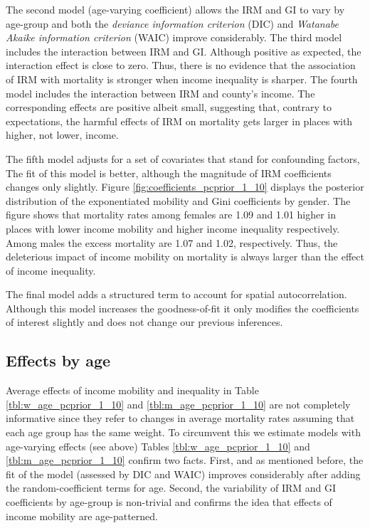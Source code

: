 \documentclass[11pt]{article}
\begin{document}
The second model (age-varying coefficient) allows the IRM and GI to vary by age-group and both the \textit{deviance information criterion} (DIC) and \textit{Watanabe Akaike information criterion} (WAIC) improve considerably. The third model includes the interaction between IRM and GI. Although positive as expected, the interaction effect is close to zero. Thus, there is no evidence that the association of IRM with mortality is stronger when income inequality is sharper. The fourth model includes the interaction between IRM and county's income. The corresponding effects are positive albeit small, suggesting that, contrary to expectations, the harmful effects of IRM on mortality gets larger in places with higher, not lower, income.  

The fifth model adjusts for a set of covariates that stand for confounding factors, The fit of this model is better, although the magnitude of IRM coefficients changes only slightly. Figure \ref{fig:coefficients_pcprior_1_10} displays the posterior distribution of the exponentiated mobility and Gini coefficients by gender. The figure shows that mortality rates among females are 1.09 and 1.01 higher in places with lower income mobility and higher income inequality respectively. Among males the excess mortality are 1.07 and 1.02, respectively. Thus, the deleterious impact of income mobility on mortality is always larger than the effect of income inequality. 

The final model adds a structured term to account for spatial autocorrelation. Although this model increases the goodness-of-fit it only modifies the coefficients of interest slightly and does not change our previous inferences.  

\subsection{Effects by age}

Average effects of income mobility and inequality in Table \ref{tbl:w_age_pcprior_1_10} and \ref{tbl:m_age_pcprior_1_10} are not completely informative since they refer to changes in average mortality rates assuming that each age group has the same weight. To circumvent this we estimate models with age-varying effects (see above) Tables \ref{tbl:w_age_pcprior_1_10} and \ref{tbl:m_age_pcprior_1_10} confirm two facts. First, and as mentioned before, the fit of the model (assessed by DIC and WAIC) improves considerably after adding the random-coefficient terms for age. Second, the variability of IRM and GI coefficients by age-group is non-trivial and confirms the idea that effects of income mobility are age-patterned. 
\end{document}
